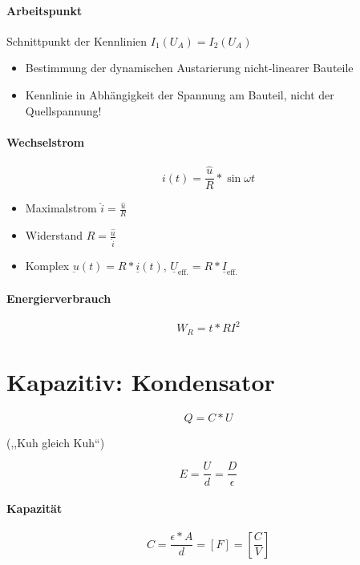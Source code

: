 \paragraph{Arbeitspunkt} Schnittpunkt der Kennlinien $I_1 (U_A) = I_2 (U_A)$

\begin{itemize}
  \item Bestimmung der dynamischen Austarierung nicht-linearer Bauteile
  \item Kennlinie in Abhängigkeit der Spannung am Bauteil, nicht der Quellspannung!
\end{itemize}

\paragraph{Wechselstrom}

$$i(t) = \frac{\hat{u}}{R} * \sin \omega t$$

\begin{itemize}
  \item Maximalstrom $\hat{i} = \frac{\hat{u}}{R}$
  \item Widerstand $R = \frac{\hat{u}}{\hat{i}}$
  \item Komplex $\underbar{u}(t) = R * \underline{i}(t)$, $\underline{U}_\text{eff.} = R * \underline{I}_\text{eff.}$
\end{itemize}

\paragraph{Energierverbrauch}

$$W_R = t * RI^2$$

\section{Kapazitiv: Kondensator}


$$Q = C * U$$

(,,Kuh gleich Kuh``)

$$E = \frac{U}{d} = \frac{D}{\epsilon}$$

\paragraph{Kapazität}

$$C = \frac{\epsilon * A}{d} = [F] = \left[\frac{C}{V}\right]$$

